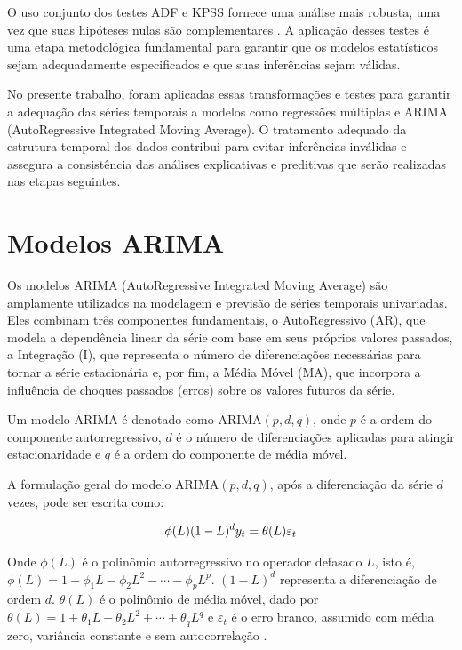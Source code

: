 \documentclass[	12pt, Times, openright, oneside, a4paper, english, brazil]{abntex2}
\begin{document}
O uso conjunto dos testes ADF e KPSS fornece uma análise mais robusta, uma vez que suas hipóteses nulas são complementares \cite{SCHLITZER1995125}. A aplicação desses testes é uma etapa metodológica fundamental para garantir que os modelos estatísticos sejam adequadamente especificados e que suas inferências sejam válidas.

No presente trabalho, foram aplicadas essas transformações e testes para garantir a adequação das séries temporais a modelos como regressões múltiplas e ARIMA (AutoRegressive Integrated Moving Average). O tratamento adequado da estrutura temporal dos dados contribui para evitar inferências inválidas e assegura a consistência das análises explicativas e preditivas que serão realizadas nas etapas seguintes.

\section{Modelos ARIMA}

Os modelos ARIMA (AutoRegressive Integrated Moving Average) são amplamente utilizados na modelagem e previsão de séries temporais univariadas. Eles combinam três componentes fundamentais, o AutoRegressivo (AR), que modela a dependência linear da série com base em seus próprios valores passados, a Integração (I), que representa o número de diferenciações necessárias para tornar a série estacionária e, por fim, a Média Móvel (MA), que incorpora a influência de choques passados (erros) sobre os valores futuros da série.

Um modelo ARIMA é denotado como ARIMA$(p,d,q)$, onde $p$ é a ordem do componente autorregressivo, $d$ é o número de diferenciações aplicadas para atingir estacionaridade e $q$ é a ordem do componente de média móvel.

A formulação geral do modelo ARIMA$(p,d,q)$, após a diferenciação da série $d$ vezes, pode ser escrita como:

\begin{equation}\hfill
\phi(L)(1 - L)^d y_t = \theta(L)\varepsilon_t
\label{eq:arima}
\end{equation}

Onde $\phi(L)$ é o polinômio autorregressivo no operador defasado $L$, isto é, $\phi(L) = 1 - \phi_1 L - \phi_2 L^2 - \cdots - \phi_p L^p$. $(1 - L)^d$ representa a diferenciação de ordem $d$. $\theta(L)$ é o polinômio de média móvel, dado por $\theta(L) = 1 + \theta_1 L + \theta_2 L^2 + \cdots + \theta_q L^q$ e $\varepsilon_t$ é o erro branco, assumido com média zero, variância constante e sem autocorrelação \cite{Cardoso2024}.
\end{document}
